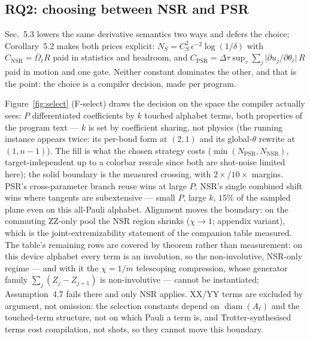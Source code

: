 \subsection{RQ2: choosing between NSR and PSR}
\label{sec:eval-select}

Sec.~5.3 lowers the same derivative semantics two ways and defers the
choice; Corollary~5.2 makes both prices explicit:
$N_{S}=C_{S}^{2}\,\epsilon^{-2}\log(1/\delta)$ with
$C_{\mathrm{NSR}}=\overline{\Omega}_{\ell}R$ paid in statistics and
headroom, and $C_{\mathrm{PSR}}=\Delta\tau\sup_{\tau}\sum_{j}\lvert
\partial u_{j}/\partial\theta_{\ell}\rvert\,R$ paid in motion and one
gate. Neither constant dominates the other, and that is the point: the
choice is a compiler decision, made per program.

Figure~\ref{fig:select} (F-select) draws the decision on the space the
compiler actually sees: $P$ differentiated coefficients by $k$ touched
alphabet terms, both properties of the program text --- $k$ is set by
coefficient sharing, not physics (the running instance appears twice: its
per-bond form at $(2,1)$ and its global-$\theta$ rewrite at $(1,n{-}1)$).
The fill is what the chosen strategy costs
($\min(N_{\mathrm{PSR}},N_{\mathrm{NSR}})$, target-independent up to a
colorbar rescale since both are shot-noise limited here); the solid
boundary is the measured crossing, with $2\times$/$10\times$ margins.
PSR's cross-parameter branch reuse wins at large $P$; NSR's single
combined shift wins where tangents are subextensive --- small $P$, large
$k$, $15\%$ of the sampled plane even on this all-Pauli alphabet.
Alignment moves the boundary: on the commuting ZZ-only pool the NSR region
shrinks ($\chi\to1$; appendix variant), which is the joint-extremizability
statement of the companion table measured. The table's remaining rows are
covered by theorem rather than measurement: on this device alphabet every
term is an involution, so the non-involutive, NSR-only regime --- and with
it the $\chi=1/m$ telescoping compression, whose generator family
$\sum_j(Z_j-Z_{j+1})$ is non-involutive --- cannot be instantiated;
Assumption~4.7 fails there and only NSR applies. XX/YY terms are excluded
by argument, not omission: the selection constants depend on
$\operatorname{diam}(A_\ell)$ and the touched-term structure, not on which
Pauli a term is, and Trotter-synthesised terms cost compilation, not
shots, so they cannot move this boundary.

